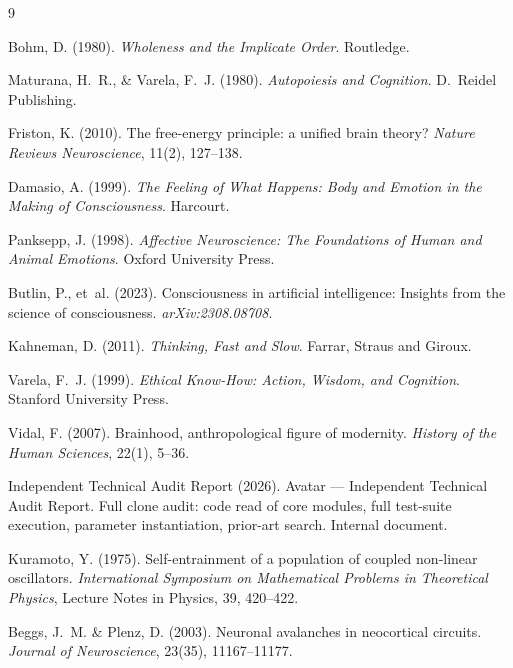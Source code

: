 \documentclass[11pt,a4paper]{article}
\begin{document}
\newpage
\begin{thebibliography}{9}

Bohm, D. (1980). \textit{Wholeness and the Implicate Order}. Routledge.

Maturana, H.\ R., \& Varela, F.\ J. (1980). \textit{Autopoiesis and Cognition}.
D.\ Reidel Publishing.

Friston, K. (2010). The free-energy principle: a unified brain theory?
\textit{Nature Reviews Neuroscience}, 11(2), 127--138.

Damasio, A. (1999). \textit{The Feeling of What Happens: Body and Emotion in the Making
of Consciousness}. Harcourt.

Panksepp, J. (1998). \textit{Affective Neuroscience: The Foundations of Human and
Animal Emotions}. Oxford University Press.

Butlin, P., et~al. (2023). Consciousness in artificial intelligence: Insights from the
science of consciousness. \textit{arXiv:2308.08708}.

Kahneman, D. (2011). \textit{Thinking, Fast and Slow}. Farrar, Straus and Giroux.

Varela, F.\ J. (1999). \textit{Ethical Know-How: Action, Wisdom, and Cognition}.
Stanford University Press.

Vidal, F. (2007). Brainhood, anthropological figure of modernity.
\textit{History of the Human Sciences}, 22(1), 5--36.

Independent Technical Audit Report (2026). Avatar --- Independent Technical Audit Report.
Full clone audit: code read of core modules, full test-suite execution, parameter
instantiation, prior-art search. Internal document.

Kuramoto, Y. (1975). Self-entrainment of a population of coupled non-linear oscillators.
\textit{International Symposium on Mathematical Problems in Theoretical Physics},
Lecture Notes in Physics, 39, 420--422.

Beggs, J.~M. \& Plenz, D. (2003). Neuronal avalanches in neocortical circuits.
\textit{Journal of Neuroscience}, 23(35), 11167--11177.

\end{thebibliography}
\end{document}
